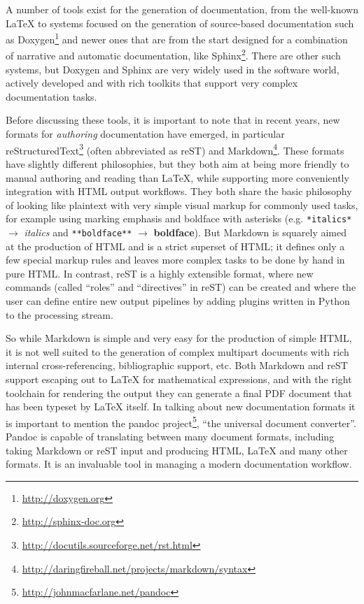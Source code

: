 \documentclass[ChapterTOCs,krantz2]{krantz} %
\begin{document}
A number of tools exist for the generation of documentation, from the
well-known \LaTeX{} to systems focused on the generation of source-based
documentation such as Doxygen\footnote{\url{http://doxygen.org}} and newer ones
that are from the start designed for a combination of narrative and automatic
documentation, like Sphinx\footnote{\url{http://sphinx-doc.org}}.  There are
other such systems, but Doxygen and Sphinx are very widely used in the software
world, actively developed and with rich toolkits that support very complex
documentation tasks.

Before discussing these tools, it is important to note that in recent years,
new formats for \emph{authoring} documentation have emerged, in particular
reStructuredText\footnote{\url{http://docutils.sourceforge.net/rst.html}}
(often abbreviated as reST) and
Markdown\footnote{\url{http://daringfireball.net/projects/markdown/syntax}}.
These formats have slightly different philosophies, but they both aim at being
more friendly to manual authoring and reading than \LaTeX{}, while supporting
more conveniently integration with HTML output workflows.  They both share the
basic philosophy of looking like plaintext with very simple visual markup for
commonly used tasks, for example using marking emphasis and boldface with
asterisks (e.g. \texttt{*italics*} $\rightarrow$ \emph{italics} and
\texttt{**boldface**} $\rightarrow$ \textbf{boldface}).  But Markdown is
squarely aimed at the production of HTML and is a strict superset of HTML; it
defines only a few special markup rules and leaves more complex tasks to be
done by hand in pure HTML.  In contrast, reST is a highly extensible format,
where new commands (called ``roles'' and ``directives'' in reST) can be created
and where the user can define entire new output pipelines by adding plugins
written in Python to the processing stream.

So while Markdown is simple and very easy for the production of simple HTML, it
is not well suited to the generation of complex multipart documents with rich
internal cross-referencing, bibliographic support, etc.  Both Markdown and reST
support escaping out to \LaTeX{} for mathematical expressions, and with the
right toolchain for rendering the output they can generate a final PDF document
that has been typeset by \LaTeX{} itself.  In talking about new documentation
formats it is important to mention the pandoc
project\footnote{\url{http://johnmacfarlane.net/pandoc}}, ``the universal
document converter''. Pandoc is capable of translating between many document
formats, including taking Markdown or reST input and producing HTML, \LaTeX{}
and many other formats.  It is an invaluable tool in managing a modern
documentation workflow.
\end{document}
